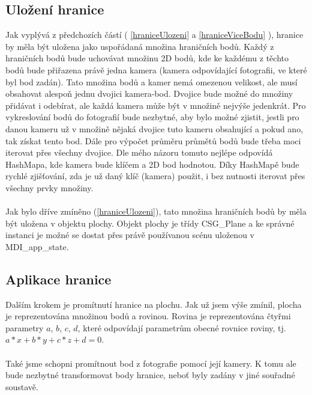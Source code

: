 \documentclass[11pt,twoside,a4paper]{book}
\begin{document}
\subsection{Uložení hranice}
Jak vyplývá z předchozích částí ( \ref{hraniceUlozeni} a \ref{hraniceViceBodu} ), hranice by měla být uložena jako uspořádaná množina hraničních bodů. Každý z hraničních bodů bude uchovávat množinu 2D bodů, kde ke každému z těchto bodů bude přiřazena právě jedna kamera (kamera odpovídající fotografii, ve které byl bod zadán). Tato množina bodů a kamer nemá omezenou velikost, ale musí obsahovat alespoň jednu dvojici kamera-bod. Dvojice bude možné do množiny přidávat i odebírat, ale každá kamera může být v množině nejvýše jedenkrát. Pro vykreslování bodů do fotografií bude nezbytné, aby bylo možné zjistit, jestli pro danou kameru už v množině nějaká dvojice tuto kameru obsahující a pokud ano, tak získat tento bod. Dále pro výpočet průměru průmětů bodů bude třeba moci iterovat přes všechny dvojice. Dle mého názoru tomuto nejlépe odpovídá HashMapa, kde kamera bude klíčem a 2D bod hodnotou. Díky HashMapě bude rychlé zjišťování, zda je už daný klíč (kamera) použit, i bez nutnosti iterovat přes všechny prvky množiny. 
\paragraph{}
Jak bylo dříve zmíněno (\ref{hraniceUlozeni}), tato množina hraničních bodů by měla být uložena v objektu plochy. Objekt plochy je třídy CSG\_Plane a ke správné instanci je možné se dostat přes právě používanou scénu uloženou v MDI\_app\_state.

\subsection{Aplikace hranice}
Dalším krokem je promítnutí hranice na plochu. Jak už jsem výše zmínil, plocha je reprezentována množinou bodů a rovinou. Rovina je reprezentována čtyřmi parametry $a$, $b$, $c$, $d$, které odpovídají parametrům obecné rovnice roviny, tj. $a*x+b*y+c*z+d=0$.
\paragraph{}
Také jsme schopni promítnout bod z fotografie pomocí její kamery. K tomu ale bude nezbytné transformovat body hranice, neboť byly zadány v jiné souřadné soustavě.
\end{document}
